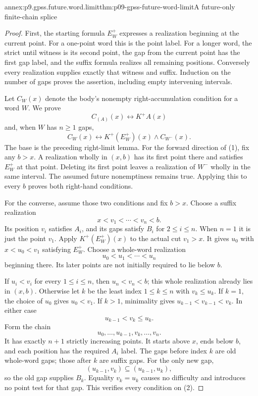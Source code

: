 \begin{annexitem}{annex:p9.gpss.future.word.limit}{thm:p09-gpss-future-word-limit}{A future-only finite-chain splice}
\begin{proof}
First, the starting formula \(E^+_W\) expresses a realization
beginning at the current point. For a one-point word this is the
point label. For a longer word, the strict until witness is its
second point, the gap from the current point has the first gap
label, and the suffix formula realizes all remaining positions.
Conversely every realization supplies exactly that witness and
suffix. Induction on the number of gaps proves the assertion,
including empty intervening intervals.

Let \(C_W(x)\) denote the body's nonempty right-accumulation
condition for a word \(W\). We prove
\[
 C_{(A)}(x)\longleftrightarrow K^+A(x)
\]
and, when \(W\) has \(n\geq1\) gaps,
\[
 C_W(x)\longleftrightarrow
                      K^+(E^+_W)(x)\land C_{W^-}(x).
 \tag{1}
\]
The base is the preceding right-limit lemma. For the forward
direction of (1), fix any \(b>x\). A realization wholly in
\((x,b)\) has its first point there and satisfies \(E^+_W\)
at that point. Deleting its first point leaves a realization of
\(W^-\) wholly in the same interval. The assumed future
nonemptiness remains true. Applying this to every \(b\) proves
both right-hand conditions.

For the converse, assume those two conditions and fix \(b>x\).
Choose a suffix realization
\[
                     x<v_1<\cdots<v_n<b.
\]
Its position \(v_i\) satisfies \(A_i\), and its gaps satisfy
\(B_i\) for \(2\leq i\leq n\). When \(n=1\) it is
just the point \(v_1\). Apply \(K^+(E^+_W)(x)\) to the
actual cut \(v_1>x\). It gives \(u_0\) with
\(x<u_0<v_1\) satisfying \(E^+_W\). Choose a whole-word
realization
\[
                         u_0<u_1<\cdots<u_n
\]
beginning there. Its later points are not initially required to
lie below \(b\).

If \(u_i<v_i\) for every \(1\leq i\leq n\), then
\(u_n<v_n<b\); this whole realization already lies in
\((x,b)\). Otherwise let \(k\) be the least index
\(1\leq k\leq n\) with \(v_k\leq u_k\).
If \(k=1\), the choice of \(u_0\) gives \(u_0<v_1\).
If \(k>1\), minimality gives
\(u_{k-1}<v_{k-1}<v_k\). In either case
\[
                         u_{k-1}<v_k\leq u_k.
\]
Form the chain
\[
                   u_0,\ldots,u_{k-1},v_k,\ldots,v_n.
 \tag{2}
\]
It has exactly \(n+1\) strictly increasing points. It starts
above \(x\), ends below \(b\), and each position has the
required \(A_i\) label. The gaps before index \(k\) are old
whole-word gaps; those after \(k\) are suffix gaps. For the
only new gap,
\[
              (u_{k-1},v_k)\subseteq(u_{k-1},u_k),
\]
so the old gap supplies \(B_k\). Equality \(v_k=u_k\)
causes no difficulty and introduces no point test for that gap.
This verifies every condition on (2).


\end{proof}
\end{annexitem}
